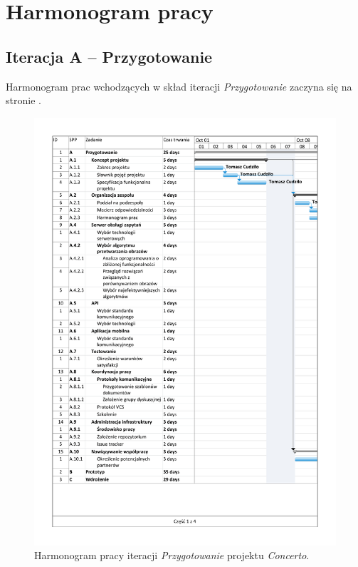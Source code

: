 \documentclass[10pt]{dokument-ppi}
\begin{document}
\MakeDokumentMeta


\section{Harmonogram pracy}

\subsection{Iteracja A -- Przygotowanie}

Harmonogram prac wchodzących w skład iteracji \emph{Przygotowanie}
zaczyna się na stronie \pageref{fig:iteracja-przygotowanie}.

\begin{figure}[p]
    \includegraphics[trim=1.2cm 1.2cm 1.2cm 1.2cm,page=1,width=\textwidth]{./figury/harmonogram-pracy-A-przygotowanie}
    \caption{Harmonogram pracy iteracji \emph{Przygotowanie} projektu \emph{Concerto}.}
    \label{fig:iteracja-przygotowanie}
\end{figure}
\end{document}
